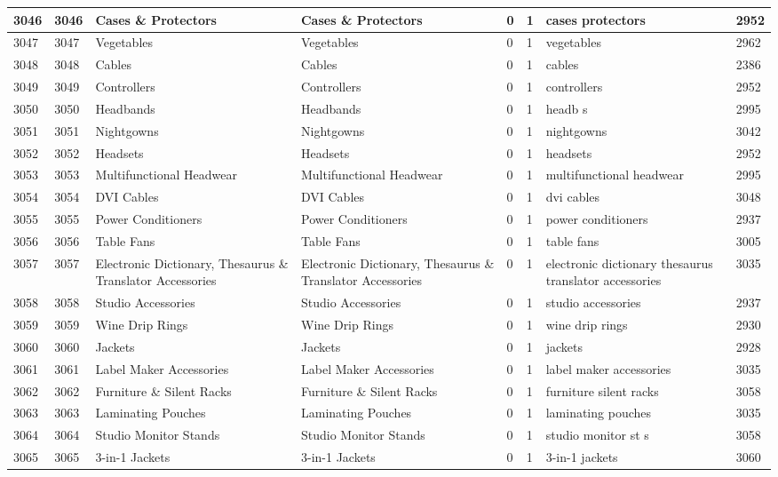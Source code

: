 \begin{longtable}{|l|l|l|l|l|l|l|l|}
3046 & 3046 & Cases \& Protectors & Cases \& Protectors & 0 & 1 & cases protectors & 2952 \\ \hline 
3047 & 3047 & Vegetables & Vegetables & 0 & 1 & vegetables & 2962 \\ \hline 
3048 & 3048 & Cables & Cables & 0 & 1 & cables & 2386 \\ \hline 
3049 & 3049 & Controllers & Controllers & 0 & 1 & controllers & 2952 \\ \hline 
3050 & 3050 & Headbands & Headbands & 0 & 1 & headb s & 2995 \\ \hline 
3051 & 3051 & Nightgowns & Nightgowns & 0 & 1 & nightgowns & 3042 \\ \hline 
3052 & 3052 & Headsets & Headsets & 0 & 1 & headsets & 2952 \\ \hline 
3053 & 3053 & Multifunctional Headwear & Multifunctional Headwear & 0 & 1 & multifunctional headwear & 2995 \\ \hline 
3054 & 3054 & DVI Cables & DVI Cables & 0 & 1 & dvi cables & 3048 \\ \hline 
3055 & 3055 & Power Conditioners & Power Conditioners & 0 & 1 & power conditioners & 2937 \\ \hline 
3056 & 3056 & Table Fans & Table Fans & 0 & 1 & table fans & 3005 \\ \hline 
3057 & 3057 & Electronic Dictionary, Thesaurus \& Translator Accessories & Electronic Dictionary, Thesaurus \& Translator Accessories & 0 & 1 & electronic dictionary thesaurus translator accessories & 3035 \\ \hline 
3058 & 3058 & Studio Accessories & Studio Accessories & 0 & 1 & studio accessories & 2937 \\ \hline 
3059 & 3059 & Wine Drip Rings & Wine Drip Rings & 0 & 1 & wine drip rings & 2930 \\ \hline 
3060 & 3060 & Jackets & Jackets & 0 & 1 & jackets & 2928 \\ \hline 
3061 & 3061 & Label Maker Accessories & Label Maker Accessories & 0 & 1 & label maker accessories & 3035 \\ \hline 
3062 & 3062 & Furniture \& Silent Racks & Furniture \& Silent Racks & 0 & 1 & furniture silent racks & 3058 \\ \hline 
3063 & 3063 & Laminating Pouches & Laminating Pouches & 0 & 1 & laminating pouches & 3035 \\ \hline 
3064 & 3064 & Studio Monitor Stands & Studio Monitor Stands & 0 & 1 & studio monitor st s & 3058 \\ \hline 
3065 & 3065 & 3-in-1 Jackets & 3-in-1 Jackets & 0 & 1 & 3-in-1 jackets & 3060 \\ \hline 

\end{longtable}
